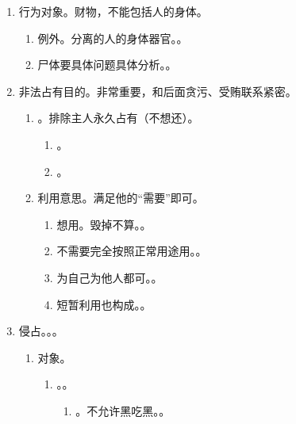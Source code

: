 \begin{enumerate}
\begin{enumerate}
        \end{enumerate}
  \item 行为对象。财物，不能包括人的身体。
        \begin{enumerate}
          \item 例外。分离的人的身体器官。。
          \item 尸体要具体问题具体分析。。
        \end{enumerate}
  \item 非法占有目的。非常重要，和后面贪污、受贿联系紧密。
        \begin{enumerate}
          \item {}。排除主人永久占有（不想还）。
                \begin{enumerate}
                  \item {}。
                  \item {}。
                \end{enumerate}
          \item 利用意思。满足他的“需要”即可。
                \begin{enumerate}
                  \item 想用。毁掉不算。。
                  \item 不需要完全按照正常用途用。。
                  \item 为自己为他人都可。。
                  \item 短暂利用也构成。。
                \end{enumerate}
        \end{enumerate}
  \item 侵占。。。
        \begin{enumerate}
          \item 对象。
                \begin{enumerate}
                  \item {}。。
                        \begin{enumerate}
                          \item {}。\er 不允许黑吃黑。。

\end{enumerate}
\end{enumerate}
\end{enumerate}
\end{enumerate}
